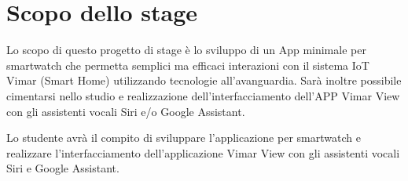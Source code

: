 \section*{Scopo dello stage}
Lo scopo di questo progetto di stage è lo sviluppo di un App minimale per smartwatch che permetta semplici ma efficaci interazioni con il sistema IoT Vimar (Smart Home) utilizzando tecnologie all'avanguardia. Sarà inoltre possibile cimentarsi nello studio e realizzazione dell'interfacciamento dell’APP Vimar View con gli assistenti vocali Siri e/o Google Assistant.

Lo studente avrà il compito di sviluppare l'applicazione per smartwatch e realizzare l'interfacciamento dell'applicazione Vimar View con gli assistenti vocali Siri e Google Assistant.

